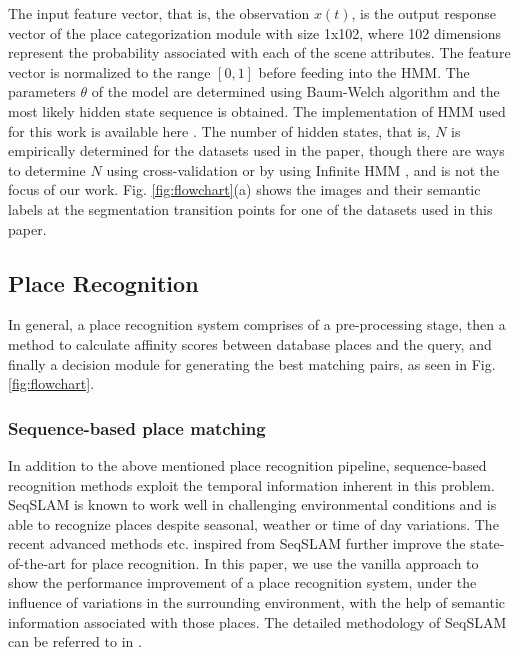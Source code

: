 \documentclass[letterpaper, 10 pt, conference]{ieeeconf}  %
\begin{document}
The input feature vector, that is, the observation $x(t)$, is the output response vector of the place categorization module with size 1x102, where 102 dimensions represent the probability associated with each of the scene attributes. The feature vector is normalized to the range $[0,1]$ before feeding into the HMM. The parameters $\theta$ of the model are determined using Baum-Welch algorithm \cite{baum1966statistical} and the most likely hidden state sequence is obtained. The implementation of HMM used for this work is available here \cite{hmmlearn}. The number of hidden states, that is, $N$ is empirically determined for the datasets used in the paper, though there are ways to determine $N$ using cross-validation \cite{celeux2008selecting} or by using Infinite HMM \cite{beal2002infinite}, and is not the focus of our work. Fig. \ref{fig:flowchart}(a) shows the images and their semantic labels at the segmentation transition points for one of the datasets used in this paper.


\subsection{Place Recognition}
In general, a place recognition system comprises of a pre-processing stage, then a method to calculate affinity scores between database places and the query, and finally a decision module for generating the best matching pairs, as seen in Fig. \ref{fig:flowchart}.
\subsubsection{Sequence-based place matching}
In addition to the above mentioned place recognition pipeline, sequence-based recognition methods exploit the temporal information inherent in this problem. SeqSLAM \cite{Milford2012} is known to work well in challenging environmental conditions and is able to recognize places despite seasonal, weather or time of day variations. The recent advanced methods \cite{milford2015sequence,wang2015improved}etc. inspired from SeqSLAM further improve the state-of-the-art for place recognition. In this paper, we use the vanilla approach to show the performance improvement of a place recognition system, under the influence of variations in the surrounding environment, with the help of semantic information associated with those places. The detailed methodology of SeqSLAM can be referred to in \cite{Milford2012}.
\end{document}
